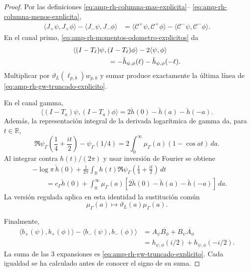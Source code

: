 \begin{proof}
Por las definiciones
\eqref{eq:amp-rh-columna-mas-explicita}--
\eqref{eq:amp-rh-columna-menos-explicita},
\begin{align}
 \langle J_+\psi,J_+\phi\rangle
 -\langle J_-\psi,J_-\phi\rangle
 &=
 \langle\mathcal C^+\psi,\mathcal C^+\phi\rangle
 -\langle\mathcal C^-\psi,\mathcal C^-\phi\rangle .
 \label{eq:amp-rh-expansion-inicial}
\end{align}
En el canal primo, \eqref{eq:amp-rh-momentos-odometro-explicitos} da
\begin{align*}
 &\langle(I-T_\ell)\psi,(I-T_\ell)\phi\rangle
 -2\langle\psi,\phi\rangle\\
 &\hspace{18mm}
 =-\check h_{\psi,\phi}(\ell)
  -\check h_{\psi,\phi}(-\ell).
\end{align*}
Multiplicar por
\(\vartheta_L(\ell_{p,k})w_{p,k}\) y sumar produce exactamente la última
línea de \eqref{eq:amp-rh-gw-truncado-explicito}.

En el canal gamma,
\[
 \langle(I-T_a)\psi,(I-T_a)\phi\rangle
 =2\check h(0)-\check h(a)-\check h(-a).
\]
Además, la representación integral de la derivada logarítmica de gamma
da, para \(t\in\mathbb R\),
\begin{equation}\label{eq:amp-rh-digamma-longitudes}
 \Re\psi_\Gamma\!\left(\frac14+\frac{it}{2}\right)-\psi_\Gamma(1/4)
 =2\int_0^\infty\mu_\Gamma(a)(1-\cos at)\,da .
\end{equation}
Al integrar contra \(h(t)/(2\pi)\) y usar inversión de Fourier se obtiene
\begin{align*}
 &-\log\pi\,\check h(0)
 +\frac1{2\pi}\int_{\mathbb R}h(t)
  \Re\psi_\Gamma\!\left(\frac14+\frac{it}{2}\right)\,dt\\
 &\qquad =
 c_\Gamma\check h(0)
 +\int_0^\infty\mu_\Gamma(a)
  [2\check h(0)-\check h(a)-\check h(-a)]\,da .
\end{align*}
La versión regulada aplica en esta identidad la sustitución común
\[
 \mu_\Gamma(a)\longmapsto
 \vartheta_L(a)\mu_\Gamma(a).
\]

Finalmente,
\begin{align*}
 \langle b_+(\psi),b_+(\phi)\rangle
 -\langle b_-(\psi),b_-(\phi)\rangle
 &=
 A_\psi\overline{B_\phi}
 +B_\psi\overline{A_\phi}\\
 &=h_{\psi,\phi}(i/2)+h_{\psi,\phi}(-i/2).
\end{align*}
La suma de las \(3\) expansiones es
\eqref{eq:amp-rh-gw-truncado-explicito}. Cada igualdad se ha calculado
antes de conocer el signo de su suma.
\end{proof}

